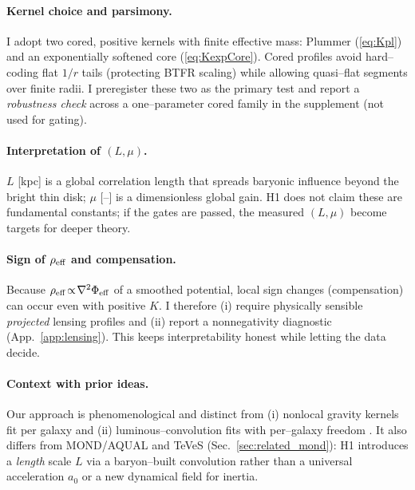 		\paragraph{Kernel choice and parsimony.}
		I adopt two cored, positive kernels with finite effective mass: Plummer (\cref{eq:Kpl}) and an exponentially softened core (\cref{eq:KexpCore}). Cored profiles avoid hard--coding flat $1/r$ tails (protecting BTFR scaling) while allowing quasi--flat segments over finite radii. I preregister these two as the primary test and report a \emph{robustness check} across a one--parameter cored family in the supplement (not used for gating).
		
		\paragraph{Interpretation of $(L,\mu)$.}
		$L$ [kpc] is a global correlation length that spreads baryonic influence beyond the bright thin disk; $\mu$ [--] is a dimensionless global gain. H1 does not claim these are fundamental constants; if the gates are passed, the measured $(L,\mu)$ become targets for deeper theory.
		
		\paragraph{Sign of $\rho_{\rm eff}$ and compensation.}
		Because $\rho_{\rm eff}\!\propto\!\nabla^2\Phi_{\rm eff}$ of a smoothed potential, local sign changes (compensation) can occur even with positive $K$. I therefore (i) require physically sensible \emph{projected} lensing profiles and (ii) report a nonnegativity diagnostic (App.~\ref{app:lensing}). This keeps interpretability honest while letting the data decide.
		
		\paragraph{Context with prior ideas.}
		Our approach is phenomenological and distinct from (i) nonlocal gravity kernels fit per galaxy \citep{rahvar2014_nonlocal_rotation} and (ii) luminous--convolution fits with per--galaxy freedom \citep{cisneros2014_lcm}. It also differs from MOND/AQUAL and TeVeS (Sec.~\ref{sec:related_mond}): H1 introduces a \emph{length} scale $L$ via a baryon--built convolution rather than a universal acceleration $a_0$ or a new dynamical field for inertia.
		
